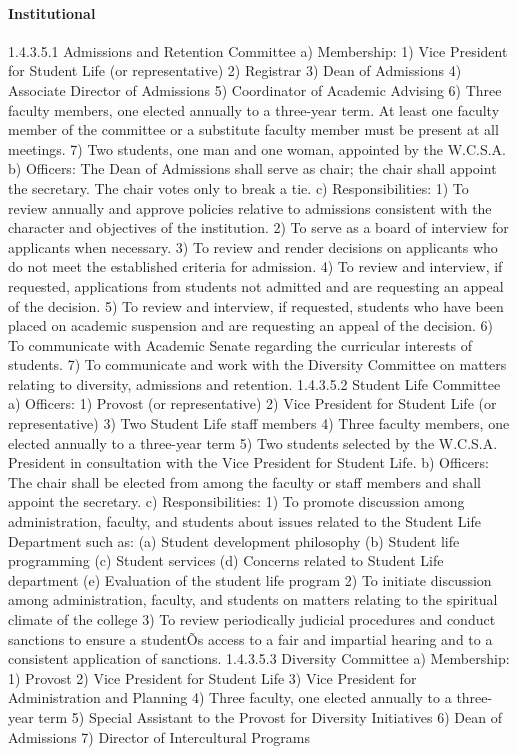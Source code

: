 \documentclass[letterpaper, 11pt]{article}
\begin{document}
			\paragraph{Institutional}
				1.4.3.5.1 Admissions and Retention Committee
				a) Membership:
				1) Vice President for Student Life (or representative)
				2) Registrar
				3) Dean of Admissions
				4) Associate Director of Admissions
				5) Coordinator of Academic Advising
				6) Three faculty members, one elected annually to a three-year term.  At least one faculty member of the committee or a substitute faculty member must be present at all meetings.
				7) Two students, one man and one woman, appointed by the W.C.S.A.
				b) Officers:
				The Dean of Admissions shall serve as chair; the chair shall appoint the secretary.  The chair votes only to break a tie.
				c) Responsibilities:
				1) To review annually and approve policies relative to admissions consistent with the character and objectives of the institution.
				2) To serve as a board of interview for applicants when necessary.
				3) To review and render decisions on applicants who do not meet the established criteria for admission.
				4) To review and interview, if requested, applications from students not admitted and are requesting an appeal of the decision.
				5) To review and interview, if requested, students who have been placed on academic suspension and are requesting an appeal of the decision.
				6) To communicate with Academic Senate regarding the curricular interests of students.
				7) To communicate and work with the Diversity Committee on matters relating to diversity, admissions and retention.
				1.4.3.5.2 Student Life Committee
				a) Officers:
				1) Provost (or representative)
				2) Vice President for Student Life (or representative)
				3) Two Student Life staff members
				4) Three faculty members, one elected annually to a three-year term
				5) Two students selected by the W.C.S.A. President in consultation with the Vice President for Student Life.
				b) Officers:
				The chair shall be elected from among the faculty or staff members and shall appoint the secretary.
				c) Responsibilities:
				1) To promote discussion among administration, faculty, and students about issues related to the Student Life Department such as:
				(a) Student development philosophy
				(b) Student life programming
				(c) Student services
				(d) Concerns related to Student Life department
				(e) Evaluation of the student life program
				2) To initiate discussion among administration, faculty, and students on matters relating to the spiritual climate of the college
				3) To review periodically judicial procedures and conduct sanctions to ensure a studentÕs access to a fair and impartial hearing and to a consistent application of sanctions.
				1.4.3.5.3 Diversity Committee
				a) Membership:
				1) Provost
				2) Vice President for Student Life
				3) Vice President for Administration and Planning
				4) Three faculty, one elected annually to a three-year term
				5) Special Assistant to the Provost for Diversity Initiatives
				6) Dean of Admissions
				7) Director of Intercultural Programs
\end{document}
